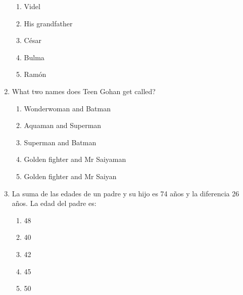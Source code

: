 \documentclass[letterpaper,addpoints,answers,twocolumn,10pt]{exam}
\begin{document}
\begin{enumerate}[leftmargin=.2in]
\begin{enumerate}[noitemsep,leftmargin=0in]
\item  Videl
\item  His grandfather
\item  César
\item  Bulma
\item  Ramón


\end{enumerate}



\item  What two names does Teen Gohan get called?


\begin{enumerate}[noitemsep,leftmargin=0in]


\item  Wonderwoman and Batman
\item  Aquaman and Superman
\item  Superman and Batman
\item  Golden fighter and Mr Saiyaman
\item  Golden fighter and Mr Saiyan


\end{enumerate}



\item  La suma de las edades de un padre y su hijo es 74 años y la diferencia 26 años. La edad del padre es:


\begin{enumerate}[noitemsep,leftmargin=0in]


\item  48
\item  40
\item  42
\item  45
\item  50


\end{enumerate}



\end{enumerate}
\end{document}
